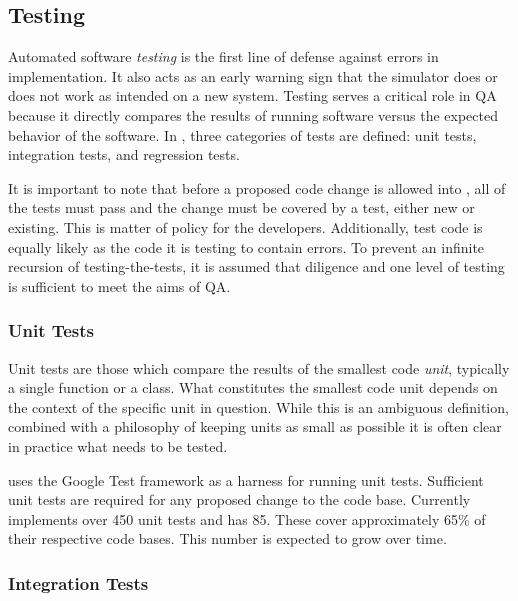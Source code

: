 \subsection{Testing}
\label{sec:qa-testing}

Automated software \emph{testing} is the first line of defense against
errors in implementation. It also acts as an early warning sign that the
simulator does or does not work as intended on a new system.
Testing serves a critical role in \gls{QA} because it directly compares the 
results of running software versus the expected behavior of the software.
In \Cyclus, three categories of tests are defined: unit tests, integration 
tests, and regression tests. 

It is important to note that before a proposed
code change is allowed into \Cyclus, all of the tests must pass
and the change must be covered by a test, either new or existing. This is 
matter of policy for the developers. Additionally, test code is equally likely 
as the code it is testing to contain errors. To prevent an infinite recursion 
of testing-the-tests, it is assumed that diligence and one level of testing 
is sufficient to meet the aims of \gls{QA}.

\subsubsection{Unit Tests}

Unit tests are those which compare the results of the smallest code \emph{unit}, 
typically a single function or a class. What constitutes the smallest code
unit depends on the context of the specific unit in question. While this is 
an ambiguous definition, combined with a philosophy of keeping units as small
as possible it is often clear in practice what needs to be tested.

\Cyclus uses the Google Test framework \cite{inc_googletest_2008} as a harness for running unit 
tests. Sufficient unit tests are required for any proposed change to the \Cyclus
code base. Currently \Cyclus implements over 450 unit tests and \Cycamore has 
85.  These cover approximately 65\% of their respective code bases. This number 
is expected to grow over time. 

\subsubsection{Integration Tests} 

